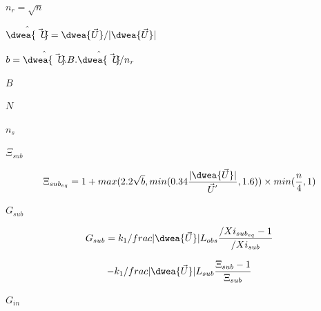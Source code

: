 \documentclass{article}
\begin{document}
$ n_{r} = \sqrt{n} $
\pagebreak

$ \hat{\dwea{\vec{U}}} = \dwea{\vec{U}} / \vert \dwea{\vec{U}}
    \vert $
\pagebreak

$ b = \hat{\dwea{\vec{U}}}.B.\hat{\dwea{\vec{U}}} / n_{r} $
\pagebreak

$ B $
\pagebreak

$ N $
\pagebreak

$  n_{s} $
\pagebreak

$ \Xi_{sub} $
\pagebreak

\[
    \Xi_{{sub}_{eq}} =
        1 + max(2.2 \sqrt{b}, min(0.34 \frac{\vert \dwea{\vec{U}}
        \vert}{{\vec{U}}^{'}}, 1.6)) \times min(\frac{n}{4}, 1)
\]
\pagebreak

$ G_{sub} $
\pagebreak

\[
    G_{sub} = k_{1} /frac{\vert \dwea{\vec{U}} \vert}{L_{obs}}
             \frac{/Xi_{{sub}_{eq}}-1}{/Xi_{sub}}
\]
\pagebreak

\[
    - k_{1} /frac{\vert \dwea{\vec{U}} \vert}{L_{sub}}
    \frac{\Xi_{sub}-1}{\Xi_{sub}}
\]
\pagebreak

$ G_{in} $
\pagebreak
\end{document}
